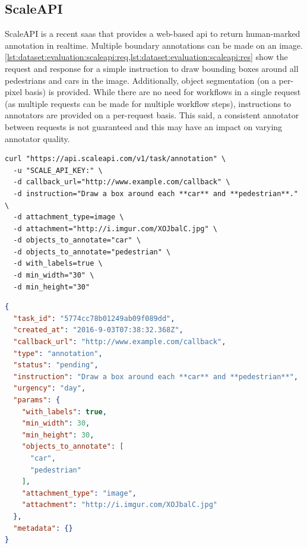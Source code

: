 
\vspace{-2em}
\subsection{ScaleAPI}

ScaleAPI is a recent \gls{saas} that provides a web-based \gls{api} to return human-marked annotation in realtime. Multiple boundary annotations can be made on an image. \cref{lst:dataset:evaluation:scaleapi:req,lst:dataset:evaluation:scaleapi:res} show the request and response for a simple instruction to draw bounding boxes around all pedestrians and cars in the image. Additionally, object segmentation (on a per-pixel basis) is provided. While there are no need for workflows in a single request (as multiple requests can be made for multiple workflow steps), instructions to annotators are provided on a per-request basis. This said, a consistent annotator between requests is not guaranteed and this may have an impact on varying annotator quality.

\begin{lstlisting}[language=CURL, label=lst:dataset:evaluation:scaleapi:req, caption={[Sample ScaleAPI request] A sample ScaleAPI HTTP request made using cURL\footnotemark.}]
curl "https://api.scaleapi.com/v1/task/annotation" \
  -u "SCALE_API_KEY:" \
  -d callback_url="http://www.example.com/callback" \
  -d instruction="Draw a box around each **car** and **pedestrian**." \
  -d attachment_type=image \
  -d attachment="http://i.imgur.com/XOJbalC.jpg" \
  -d objects_to_annotate="car" \
  -d objects_to_annotate="pedestrian" \
  -d with_labels=true \
  -d min_width="30" \
  -d min_height="30"  
\end{lstlisting}

\begin{lstlisting}[language=JSON, label=lst:dataset:evaluation:scaleapi:res, caption={[Sample ScaleAPI response] Sample \glsac{json} response from the request made in \cref{lst:dataset:evaluation:scaleapi:req}.}]
{
  "task_id": "5774cc78b01249ab09f089dd",
  "created_at": "2016-9-03T07:38:32.368Z",
  "callback_url": "http://www.example.com/callback",
  "type": "annotation",
  "status": "pending",
  "instruction": "Draw a box around each **car** and **pedestrian**",
  "urgency": "day",
  "params": {
    "with_labels": true,
    "min_width": 30,
    "min_height": 30,
    "objects_to_annotate": [
      "car",
      "pedestrian"
    ],
    "attachment_type": "image",
    "attachment": "http://i.imgur.com/XOJbalC.jpg"
  },
  "metadata": {}
}
\end{lstlisting}
